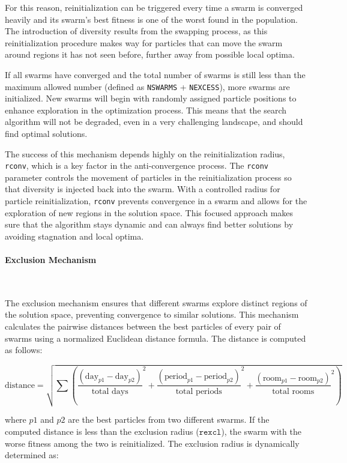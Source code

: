 For this reason, reinitialization can be triggered every time a swarm is converged heavily and its swarm's best fitness is one of the worst found in the population. The introduction of diversity results from the swapping process, as this reinitialization procedure makes way for particles that can move the swarm around regions it has not seen before, further away from possible local optima.

If all swarms have converged and the total number of swarms is still less than the maximum allowed number (defined as \texttt{NSWARMS} + \texttt{NEXCESS}), more swarms are initialized. New swarms will begin with randomly assigned particle positions to enhance exploration in the optimization process. This means that the search algorithm will not be degraded, even in a very challenging landscape, and should find optimal solutions.

The success of this mechanism depends highly on the reinitialization radius, \texttt{rconv}, which is a key factor in the anti-convergence process. The \texttt{rconv} parameter controls the movement of particles in the reinitialization process so that diversity is injected back into the swarm. With a controlled radius for particle reinitialization, \texttt{rconv} prevents convergence in a swarm and allows for the exploration of new regions in the solution space. This focused approach makes sure that the algorithm stays dynamic and can always find better solutions by avoiding stagnation and local optima.

\paragraph{Exclusion Mechanism}\

The exclusion mechanism ensures that different swarms explore distinct regions of the solution space, preventing convergence to similar solutions. This mechanism calculates the pairwise distances between the best particles of every pair of swarms using a normalized Euclidean distance formula. The distance is computed as follows:

\[
\text{distance} = \sqrt{
\sum \left(
\frac{(\text{day}_{p1} - \text{day}_{p2})}{\text{total days}}^2 +
\frac{(\text{period}_{p1} - \text{period}_{p2})}{\text{total periods}}^2 +
\frac{(\text{room}_{p1} - \text{room}_{p2})}{\text{total rooms}}^2
\right)
}
\]

where \(p1\) and \(p2\) are the best particles from two different swarms. If the computed distance is less than the exclusion radius (\(\texttt{rexcl}\)), the swarm with the worse fitness among the two is reinitialized. The exclusion radius is dynamically determined as:

